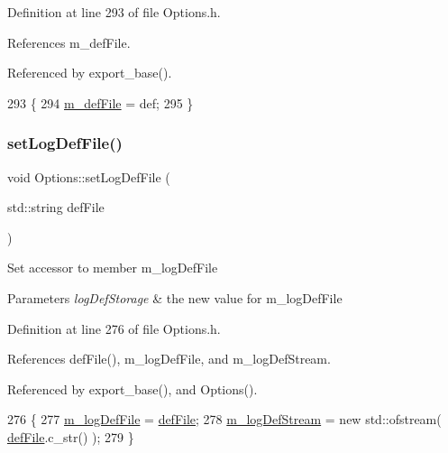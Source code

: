 Definition at line 293 of file Options.\+h.



References m\+\_\+def\+File.



Referenced by export\+\_\+base().


\begin{DoxyCode}
293                                         \{
294                 \hyperlink{classOptions_a59ff5f2cab2490fb529367de13a2321a}{m\_defFile} = def;
295         \}
\end{DoxyCode}
\mbox{\label{classOptions_a52e2995912a71f51c230dd6bf28b6a94}} 
\subsubsection{\texorpdfstring{set\+Log\+Def\+File()}{setLogDefFile()}}
{\footnotesize\ttfamily void Options\+::set\+Log\+Def\+File (\begin{DoxyParamCaption}\item[{std\+::string}]{def\+File }\end{DoxyParamCaption})\hspace{0.3cm}{\ttfamily [inline]}}

Set accessor to member m\+\_\+log\+Def\+File 
\begin{DoxyParams}{Parameters}
{\em log\+Def\+Storage} & the new value for m\+\_\+log\+Def\+File \\
\hline
\end{DoxyParams}


Definition at line 276 of file Options.\+h.



References def\+File(), m\+\_\+log\+Def\+File, and m\+\_\+log\+Def\+Stream.



Referenced by export\+\_\+base(), and Options().


\begin{DoxyCode}
276                                                \{
277                 \hyperlink{classOptions_abaef6cdcc8422b199084510d173edbe6}{m\_logDefFile} = \hyperlink{classOptions_aca5ce5262ca717eaad5ff9db92ad1948}{defFile};
278                 \hyperlink{classOptions_aebb2db3fb07ea1f73b27bde841be69d8}{m\_logDefStream} = \textcolor{keyword}{new} std::ofstream( \hyperlink{classOptions_aca5ce5262ca717eaad5ff9db92ad1948}{defFile}.c\_str() );
279         \}
\end{DoxyCode}
\mbox{\label{classOptions_a5d8ab053c941a944a53c0bfe871058a1}} 
